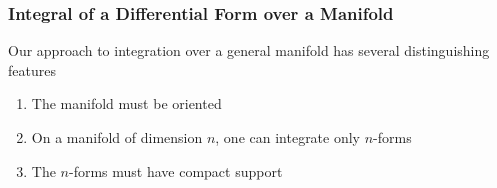 \subsubsection{Integral of a Differential Form over a Manifold}

Our approach to integration over a general manifold has several distinguishing features
\begin{enumerate}
    \item The manifold must be oriented 
    \item On a manifold of dimension \(n\), one can integrate only \(n\)-forms 
    \item The \(n\)-forms must have compact support
\end{enumerate}
